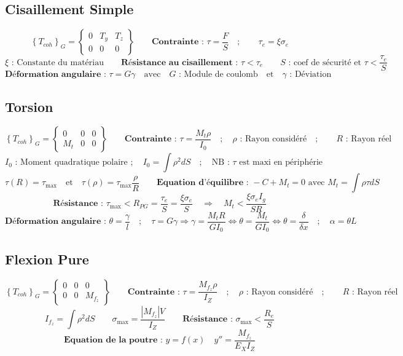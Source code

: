 \documentclass[12pt]{article}
\begin{document}
	\subsection*{Cisaillement Simple}
	$$ \left\lbrace T_{coh}\right\rbrace_G = \left\lbrace \begin{array}{ccc}
	0 & T_y & T_z\\ 0& 0& 0
	\end{array} \right\rbrace
	\qquad
	\textbf{Contrainte : } \tau = \dfrac{F}{S} \quad;\qquad \tau_e=\xi \sigma_e $$
	$$ \xi \text{ : Constante du matériau}
	\qquad \textbf{Résistance au cisaillement : } \tau<\tau_e \qquad 
	S \text{ : coef de sécurité et } \tau < \frac{\tau_e}{S} $$
	$$ \textbf{Déformation angulaire : } \tau = G\gamma \quad \text{avec} \quad G \text{ : Module de coulomb} \quad \text{et} \quad \gamma \text{ : Déviation}$$
	
	\subsection*{Torsion}
	$$ \left\lbrace T_{coh}\right\rbrace_G = \left\lbrace \begin{array}{ccc}
	0 & 0 & 0\\ M_t& 0& 0
	\end{array} \right\rbrace
	\qquad
	\textbf{Contrainte : } \tau = \dfrac{M_t\rho}{I_0} \quad;\quad \rho \text{ : Rayon considéré} \quad ; \qquad R \text{ : Rayon réel} $$
	$$ I_0 \text{ : Moment quadratique polaire } ;\quad I_0=\int \rho^2 dS\quad;\quad \text{NB : } \tau \text{ est maxi en périphérie}$$
	$$ 
	\tau(R)=\tau_\text{max} \quad \text{et} \quad \tau(\rho)=\tau_\text{max}\frac{\rho}{R} 
	\qquad \textbf{Equation d'équilibre : } -C+M_t=0 \text{ avec } M_t = \int \rho \tau dS
	$$
	$$
	\textbf{Résistance : } \tau_\text{max} < R_{PG}=\frac{\tau_e}{S}=\frac{\xi\sigma_e}{S}
	\quad \Rightarrow \quad M_t<\frac{\xi\sigma_eI_g}{SR}
	$$
	$$
	\textbf{Déformation angulaire : } \theta = \frac{\gamma}{l} \quad ; \quad \tau=G\gamma \Rightarrow \gamma = \frac{M_tR}{GI_0} \Leftrightarrow \theta=\frac{M_t}{GI_0}\Leftrightarrow\theta=\frac{\delta}{\delta x} \quad ; \quad \alpha = \theta L
	$$
	
	\subsection*{Flexion Pure}
	$$
	\left\lbrace T_{coh}\right\rbrace_G = \left\lbrace \begin{array}{ccc}
	0 & 0 & 0\\ 0& 0& M_{f_z}
	\end{array} \right\rbrace
	\qquad
	\textbf{Contrainte : } \tau = \dfrac{M_{f_z}\rho}{I_Z} \quad;\quad \rho \text{ : Rayon considéré} \quad ; \qquad R \text{ : Rayon réel}
	$$
	$$
	I_{f_z}=\int \rho^2 dS \qquad
	\sigma_\text{max} = \frac{\left|M_{f_z}\right|V}{I_Z} \qquad
	\textbf{Résistance : } \sigma_\text{max}<\frac{R_e}{S}
	$$
	$$
	\textbf{Equation de la poutre : }y=f(x)\quad y''=\frac{M_{f_z}}{E_XI_Z}
	$$
	
\end{document}
